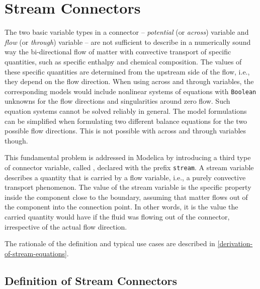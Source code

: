 \chapter{Stream Connectors}\label{stream-connectors}

The two basic variable types in a connector -- \emph{potential} (or \emph{across}) variable and \emph{flow} (or \emph{through}) variable -- are not sufficient to describe in a numerically sound way the bi-directional flow of matter with convective transport of specific quantities, such as specific enthalpy and chemical composition.
The values of these specific quantities are determined from the upstream side of the flow, i.e., they depend on the flow direction.
When using across and through variables, the corresponding models would include nonlinear systems of equations with \lstinline!Boolean! unknowns for the flow directions and singularities around zero flow.
Such equation systems cannot be solved reliably in general.
The model formulations can be simplified when formulating two different balance equations for the two possible flow directions.
This is not possible with across and through variables though.

This fundamental problem is addressed in Modelica by introducing a third type of connector variable, called , declared with the prefix \lstinline!stream!.
A stream variable describes a quantity that is carried by a flow variable, i.e., a purely convective transport phenomenon.
The value of the stream variable is the specific property inside the component close to the boundary, assuming that matter flows out of the component into the connection point.
In other words, it is the value the carried quantity would have if the fluid was flowing out of the connector, irrespective of the actual flow direction.

The rationale of the definition and typical use cases are described in
\cref{derivation-of-stream-equations}.

\section{Definition of Stream Connectors}\label{definition-of-stream-connectors}

